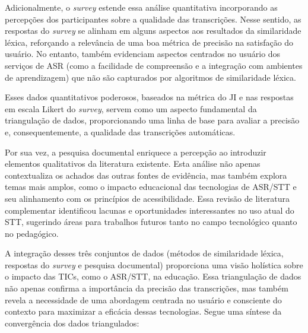 Adicionalmente, o \textit{survey} estende essa análise quantitativa incorporando as percepções dos participantes sobre a qualidade das transcrições. Nesse sentido, as respostas do \textit{survey} se alinham em alguns aspectos aos resultados da similaridade léxica, reforçando a relevância de uma boa métrica de precisão na satisfação do usuário. No entanto, também evidenciam aspectos centrados no usuário dos serviços de ASR (como a facilidade de compreensão e a integração com ambientes de aprendizagem) que não são capturados por algoritmos de similaridade léxica.

Esses dados quantitativos poderosos, baseados na métrica do JI e nas respostas em escala Likert do \textit{survey}, servem como um aspecto fundamental da triangulação de dados, proporcionando uma linha de base para avaliar a precisão e, consequentemente, a qualidade das transcrições automáticas.

Por sua vez, a pesquisa documental enriquece a percepção ao introduzir elementos qualitativos da literatura existente. Esta análise não apenas contextualiza os achados das outras fontes de evidência, mas também explora temas mais amplos, como o impacto educacional das tecnologias de ASR/STT e seu alinhamento com os princípios de acessibilidade. Essa revisão de literatura complementar identificou lacunas e oportunidades interessantes no uso atual do STT, sugerindo áreas para trabalhos futuros tanto no campo tecnológico quanto no pedagógico.

A integração desses três conjuntos de dados (métodos de similaridade léxica, respostas do \textit{survey} e pesquisa documental) proporciona uma visão holística sobre o impacto das TICs, como o ASR/STT, na educação. Essa triangulação de dados não apenas confirma a importância da precisão das transcrições, mas também revela a necessidade de uma abordagem centrada no usuário e consciente do contexto para maximizar a eficácia dessas tecnologias. Segue uma síntese da convergência dos dados triangulados:

